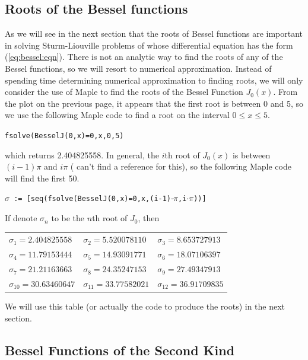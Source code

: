 \subsection{Roots of the Bessel functions}

As we will see in the next section that the roots of Bessel functions are important in solving Sturm-Liouville problems of whose differential equation has the form (\ref{eq:bessel:eqn}).
There is not an analytic way to find the roots of any of the Bessel functions, so we will resort to numerical approximation.  Instead of spending time determining numerical approximation to finding roots, we will only consider the use of Maple to find the roots of the Bessel Function $J_0(x)$.  From the plot on the previous page, it appears that the first root is between 0 and 5, so we use the following Maple code to find a root on the interval $0 \leq x \leq 5$.
%
\begin{center}
\texttt{fsolve(BesselJ(0,x)=0,x,0,5)}
\end{center}
which returns 2.404825558.  In general, the $i$th root of $J_0(x)$ is between $(i-1)\pi$ and $i\pi$ ({\color{red} can't find a reference for this}), so the following Maple code will find the first 50.

\begin{center}
\texttt{$\sigma$ := [seq(fsolve(BesselJ(0,x)=0,x,(i-1)$\cdot\pi$,i$\cdot\pi$))]}
\end{center}
%
If denote $\sigma_n$ to be the $n$th root of $J_0$, then
%
\begin{center}
\begin{tabular}{lll}
$\sigma_1 = 2.404825558$ & $\sigma_2 = 5.520078110$ & $\sigma_3 = 8.653727913$ \\
$\sigma_4= 11.79153444$ & $\sigma_5 = 14.93091771$ & $\sigma_6 = 18.07106397$ \\
$\sigma_7= 21.21163663$ & $\sigma_8 = 24.35247153$ & $\sigma_9 =  27.49347913$ \\
$\sigma_{10} =30.63460647$ & $\sigma_{11} = 33.77582021$ & $\sigma_{12} = 36.91709835$
\end{tabular}
\end{center}

We will use this table (or actually the code to produce the roots) in the next section.


\subsection{Bessel Functions of the Second Kind}

